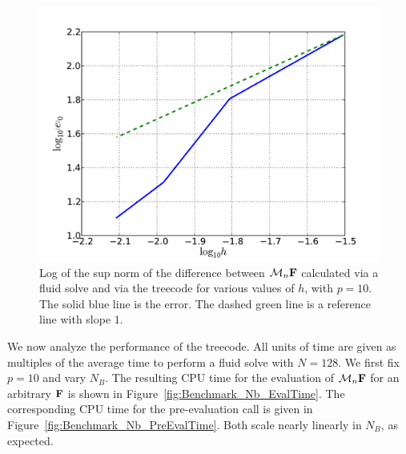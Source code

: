 \begin{figure}[!b]
	\begin{center}
		\includegraphics[bb=0in 0in 7.7in 6.3in,width=\StandardFigureWidth,clip]{Images_Methodology/Benchmark_h_MaxDif.pdf}
	\end{center}
	\caption{Log of the sup norm of the difference between $\mathcal{M}_n\mathbf{F}$ calculated via a fluid solve and via the treecode for various values of $h$, with $p=10$. The solid blue line is the error. The dashed green line is a reference line with slope $1$.}
	\label{fig:Benchmark_h_MaxDif}
\end{figure}

We now analyze the performance of the treecode. All units of time are given as multiples of the average time to perform a fluid solve with $N=128$.
We first fix $p=10$ and vary $N_B$. The resulting CPU time for the evaluation of $\mathcal{M}_n\mathbf{F}$ for an arbitrary $\mathbf{F}$ is shown in Figure~\ref{fig:Benchmark_Nb_EvalTime}. The corresponding CPU time for the pre-evaluation call is given in Figure~\ref{fig:Benchmark_Nb_PreEvalTime}. Both scale nearly linearly in $N_B$,  as expected.



